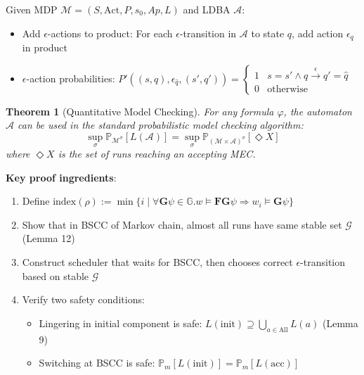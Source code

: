 \documentclass{article}
\newtheorem{theorem}{Theorem}
\begin{document}
Given MDP $\mathcal{M} = (S, \text{Act}, P, s_0, Ap, L)$ and LDBA $\mathcal{A}$:

\begin{itemize}
    \item Add $\epsilon$-actions to product: For each $\epsilon$-transition in $\mathcal{A}$ to state $q$, add action $\epsilon_q$ in product
    \item $\epsilon$-action probabilities: $P'((s,q), \epsilon_{\hat{q}}, (s',q')) = \begin{cases}1 & s = s' \land q \xrightarrow{\epsilon} q' = \hat{q}\\ 0 & \text{otherwise}\end{cases}$
\end{itemize}

\begin{theorem}[Quantitative Model Checking]
For any formula $\varphi$, the automaton $\mathcal{A}$ can be used in the standard probabilistic model checking algorithm:
\begin{equation}
\sup_\sigma \mathbb{P}_{\mathcal{M}^\sigma}[L(\mathcal{A})] = \sup_\sigma \mathbb{P}_{(\mathcal{M} \times \mathcal{A})^\sigma}[\Diamond X]
\end{equation}
where $\Diamond X$ is the set of runs reaching an accepting MEC.
\end{theorem}

\textbf{Key proof ingredients}:
\begin{enumerate}
    \item Define $\text{index}(\rho) := \min\{i \mid \forall \mathbf{G}\psi \in \mathbb{G}. w \models \mathbf{F}\mathbf{G}\psi \Rightarrow w_i \models \mathbf{G}\psi\}$
    \item Show that in BSCC of Markov chain, almost all runs have same stable set $\mathcal{G}$ (Lemma 12)
    \item Construct scheduler that waits for BSCC, then chooses correct $\epsilon$-transition based on stable $\mathcal{G}$
    \item Verify two safety conditions:
    \begin{itemize}
        \item Lingering in initial component is safe: $L(\text{init}) \supseteq \bigcup_{a \in \text{All}} L(a)$ (Lemma 9)
        \item Switching at BSCC is safe: $\mathbb{P}_m[L(\text{init})] = \mathbb{P}_m[L(\text{acc})]$
    \end{itemize}
\end{enumerate}
\end{document}
